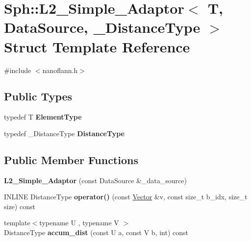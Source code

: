 \hypertarget{structSph_1_1L2__Simple__Adaptor}{}\section{Sph\+:\+:L2\+\_\+\+Simple\+\_\+\+Adaptor$<$ T, Data\+Source, \+\_\+\+Distance\+Type $>$ Struct Template Reference}
\label{structSph_1_1L2__Simple__Adaptor}


{\ttfamily \#include $<$nanoflann.\+h$>$}

\subsection*{Public Types}
\begin{DoxyCompactItemize}
\item 
\hypertarget{structSph_1_1L2__Simple__Adaptor_a64cd5f78be4a7df1ece85da0d24d2c5e}{}\label{structSph_1_1L2__Simple__Adaptor_a64cd5f78be4a7df1ece85da0d24d2c5e} 
typedef T {\bfseries Element\+Type}
\item 
\hypertarget{structSph_1_1L2__Simple__Adaptor_aa5b81d99d6560f6ae2c972ba3b2f1d43}{}\label{structSph_1_1L2__Simple__Adaptor_aa5b81d99d6560f6ae2c972ba3b2f1d43} 
typedef \+\_\+\+Distance\+Type {\bfseries Distance\+Type}
\end{DoxyCompactItemize}
\subsection*{Public Member Functions}
\begin{DoxyCompactItemize}
\item 
\hypertarget{structSph_1_1L2__Simple__Adaptor_aa84d15fc2fe33c17bf55957bbdb876d3}{}\label{structSph_1_1L2__Simple__Adaptor_aa84d15fc2fe33c17bf55957bbdb876d3} 
{\bfseries L2\+\_\+\+Simple\+\_\+\+Adaptor} (const Data\+Source \&\+\_\+data\+\_\+source)
\item 
\hypertarget{structSph_1_1L2__Simple__Adaptor_acb6d8cef6fda8b73d803e06322774049}{}\label{structSph_1_1L2__Simple__Adaptor_acb6d8cef6fda8b73d803e06322774049} 
I\+N\+L\+I\+NE Distance\+Type {\bfseries operator()} (const \hyperlink{classBasicVector}{Vector} \&v, const size\+\_\+t b\+\_\+idx, size\+\_\+t size) const
\item 
\hypertarget{structSph_1_1L2__Simple__Adaptor_abc1a6fc67867af8cdbc17ab20809b6ad}{}\label{structSph_1_1L2__Simple__Adaptor_abc1a6fc67867af8cdbc17ab20809b6ad} 
{\footnotesize template$<$typename U , typename V $>$ }\\Distance\+Type {\bfseries accum\+\_\+dist} (const U a, const V b, int) const
\end{DoxyCompactItemize}
